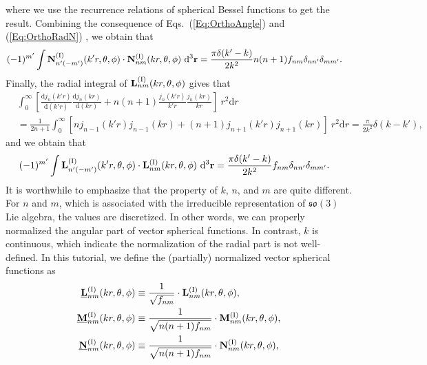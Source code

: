 \documentclass[journal=jacsat,manuscript=article,layout=traditional]{achemso}
\newcommand*\diff{\mathrm{d}}
\newcommand{\norF}[1]{\underline{\vb{#1}}}
\newcommand{\RomanI}{\scriptsize\textrm{I}}
\begin{document}
where we use the recurrence relations of spherical Bessel functions to get the result.
Combining the consequence of Eqs.~(\ref{Eq:OrthoAngle}) and (\ref{Eq:OrthoRadN}) , we obtain that
\begin{align}
    (-1)^{m'}\int \mathbf{N}_{n'(-m')}^{(\RomanI)}(k'r,\theta,\phi)\cdot\mathbf{N}_{nm}^{(\RomanI)}(kr,\theta,\phi)~\diff^3{\mathbf{r}}
    &= \frac{\pi\delta(k'-k)}{2k^2}n(n+1)f_{nm}\delta_{nn'}\delta_{mm'}.
    \label{Eq:orthoN}
\end{align}
Finally, the radial integral of $\vb{L}_{nm}^{(\RomanI)}(kr,\theta,\phi)$ gives that
\begin{align}
    \nonumber
    &\int_0^\infty
    \left[
    \frac{\diff j_{n}(k'r)}{\diff{(k'r)}}
    \frac{\diff j_{n}(kr)}{\diff{(kr)}}+
    n(n+1)\frac{j_{n}(k'r)}{k'r}\frac{j_{n}(kr)}{kr}
    \right]~r^2\diff{r}\\
    &=\frac{1}{2n+1}\int_0^\infty
    \left[nj_{n-1}(k'r)j_{n-1}(kr)+
    (n+1)j_{n+1}(k'r)j_{n+1}(kr)
    \right]~r^2\diff{r}=
    \frac{\pi}{2k^2}\delta(k-k'),
    \label{Eq:OrthoRadL}
\end{align}
and we obtain that
\begin{align}
    \label{Eq:orthoL}
    (-1)^{m'}\int \mathbf{L}_{n'(-m')}^{(\RomanI)}(k'r,\theta,\phi)\cdot\mathbf{L}_{nm}^{(\RomanI)}(kr,\theta,\phi)~\diff^3{\mathbf{r}}
    &= \frac{\pi\delta(k'-k)}{2k^2}f_{nm}\delta_{nn'}\delta_{mm'}.
\end{align}
It is worthwhile to emphasize that the property of $k$, $n$, and $m$ are quite different.
For $n$ and $m$, which is associated with the irreducible representation of $\mathfrak{so}(3)$ Lie algebra, the values are discretized.
In other words, we can properly normalized the angular part of vector spherical functions.
In contrast, $k$ is continuous, which indicate the normalization of the radial part is not well-defined.
In this tutorial, we define the (partially) normalized vector spherical functions as
\begin{subequations}
    \begin{align}
        \norF{L}_{nm}^{(\RomanI)}(kr,\theta,\phi)&\equiv \frac{1}{\sqrt{f_{nm}}}\cdot\vb{L}_{nm}^{(\RomanI)}(kr,\theta,\phi),\\
        \norF{M}_{nm}^{(\RomanI)}(kr,\theta,\phi)&\equiv \frac{1}{\sqrt{n(n+1)f_{nm}}}\cdot\vb{M}_{nm}^{(\RomanI)}(kr,\theta,\phi),\\
        \norF{N}_{nm}^{(\RomanI)}(kr,\theta,\phi)&\equiv \frac{1}{\sqrt{n(n+1)f_{nm}}}\cdot\vb{N}_{nm}^{(\RomanI)}(kr,\theta,\phi),
    \end{align}    
\end{subequations}
\end{document}
